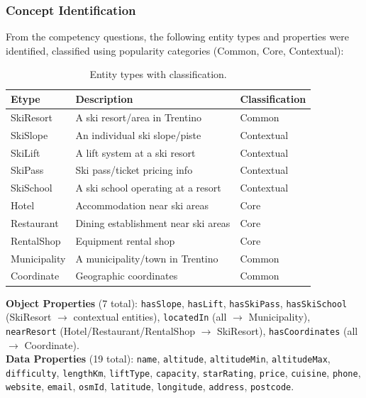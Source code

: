 \subsubsection{Concept Identification}

From the competency questions, the following entity types and properties were identified, classified using popularity categories (Common, Core, Contextual):

\begin{table}[h!]
\centering
\small
\begin{tabular}{|l|p{6cm}|l|}
\hline
\textbf{Etype} & \textbf{Description} & \textbf{Classification} \\
\hline
SkiResort & A ski resort/area in Trentino & Common \\
SkiSlope & An individual ski slope/piste & Contextual \\
SkiLift & A lift system at a ski resort & Contextual \\
SkiPass & Ski pass/ticket pricing info & Contextual \\
SkiSchool & A ski school operating at a resort & Contextual \\
Hotel & Accommodation near ski areas & Core \\
Restaurant & Dining establishment near ski areas & Core \\
RentalShop & Equipment rental shop & Core \\
Municipality & A municipality/town in Trentino & Common \\
Coordinate & Geographic coordinates & Common \\
\hline
\end{tabular}
\caption{Entity types with classification.}
\label{tab:etypes}
\end{table}

\noindent\textbf{Object Properties} (7 total): \texttt{hasSlope}, \texttt{hasLift}, \texttt{hasSkiPass}, \texttt{hasSkiSchool} (SkiResort $\rightarrow$ contextual entities), \texttt{locatedIn} (all $\rightarrow$ Municipality), \texttt{nearResort} (Hotel/Restaurant/RentalShop $\rightarrow$ SkiResort), \texttt{hasCoordinates} (all $\rightarrow$ Coordinate).\\

\noindent\textbf{Data Properties} (19 total): \texttt{name}, \texttt{altitude}, \texttt{altitudeMin}, \texttt{altitudeMax}, \texttt{difficulty}, \texttt{lengthKm}, \texttt{liftType}, \texttt{capacity}, \texttt{starRating}, \texttt{price}, \texttt{cuisine}, \texttt{phone}, \texttt{website}, \texttt{email}, \texttt{osmId}, \texttt{latitude}, \texttt{longitude}, \texttt{address}, \texttt{postcode}.

